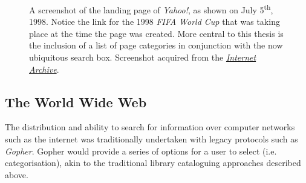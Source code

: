 \begin{figure}[t!]
    \centering
    \caption[Screenshot of \emph{Yahoo!} Search, July 1998]{A screenshot of the landing page of \emph{Yahoo!}, as shown on July 5\textsuperscript{th}, 1998. Notice the link for the 1998 \emph{FIFA World Cup} that was taking place at the time the page was created. More central to this thesis is the inclusion of a list of page categories in conjunction with the now ubiquitous search box. Screenshot acquired from the \href{https://web.archive.org/web/19980705003104/http://www.yahoo.com}{\emph{Internet Archive}}.}
    \label{fig:yahoo}
\end{figure}


\subsection{The World Wide Web}\label{sec:ir_background:history:www}
The distribution and ability to search for information over computer networks such as the internet was traditionally undertaken with legacy protocols such as \emph{Gopher}. Gopher would provide a series of options for a user to select (i.e. categorisation), akin to the traditional library cataloguing approaches described above.

